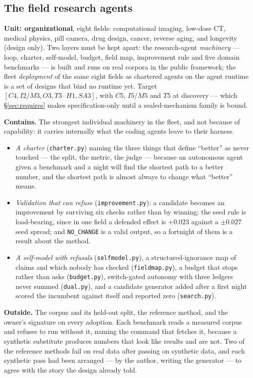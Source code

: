 \subsection{The field research agents}\label{sec:research}

\textbf{Unit: organizational}, eight fields: computational imaging, low-dose CT, medical physics, pill camera, drug design, cancer, reverse aging, and longevity (design only). Two layers must be kept apart: the research-agent \emph{machinery} --- loop, charter, self-model, budget, field map, improvement rule and five domain benchmarks --- is built and runs on real corpora in the public framework; the fleet \emph{deployment} of the same eight fields as chartered agents on the agent runtime is a set of designs that bind no runtime yet. Target $[C4, I2/M3, O3, T3\cdot H1, SA3]$, with $C5$, $I5/M5$ and $T5$ at discovery --- which \S\ref{sec:requires} makes specification-only until a sealed-mechanism family is bound.

\textbf{Contains.} The strongest individual machinery in the fleet, and not because of capability: it carries internally what the coding agents leave to their harness.
\begin{itemize}[leftmargin=*]
\item \emph{A charter} (\texttt{charter.py}) naming the three things that define ``better'' as never touched --- the split, the metric, the judge --- because an autonomous agent given a benchmark and a night will find the shortest path to a better number, and the shortest path is almost always to change what ``better'' means.
\item \emph{Validation that can refuse} (\texttt{improvement.py}): a candidate becomes an improvement by surviving six checks rather than by winning; the seed rule is load-bearing, since in one field a defended effect is $+0.023$ against a $\pm0.027$ seed spread; and \texttt{NO\_CHANGE} is a valid output, so a fortnight of them is a result about the method.
\item \emph{A self-model with refusals} (\texttt{selfmodel.py}), a structured-ignorance map of claims and which nobody has checked (\texttt{fieldmap.py}), a budget that stops rather than asks (\texttt{budget.py}), switch-gated autonomy with three ledgers never summed (\texttt{dual.py}), and a candidate generator added after a first night scored the incumbent against itself and reported zero (\texttt{search.py}).
\end{itemize}

\textbf{Outside.} The corpus and its held-out split, the reference method, and the owner's signature on every adoption. Each benchmark reads a measured corpus and refuses to run without it, naming the command that fetches it, because a synthetic substitute produces numbers that look like results and are not. Two of the reference methods fail on real data after passing on synthetic data, and each synthetic pass had been arranged --- by the author, writing the generator --- to agree with the story the design already told.


